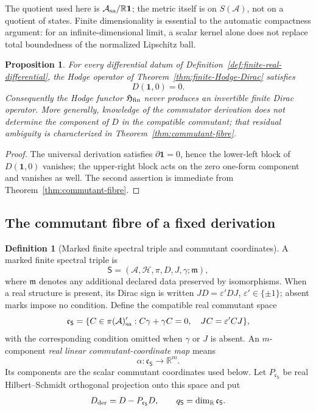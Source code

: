 \documentclass[11pt]{article}
\newtheorem{proposition}[proposition]{Proposition}
\theoremstyle{definition}
\newtheorem{definition}[definition]{Definition}
\theoremstyle{remark}
\theoremstyle{definition}
\theoremstyle{remark}
\newcommand{\R}{\mathbb R}
\newcommand{\one}{\mathbf 1}
\newcommand{\A}{\mathcal A}
\newcommand{\Hh}{\mathcal H}
\begin{document}
The quotient used here is $\A_{\rm sa}/\R\one$; the metric itself is on
$S(\A)$, not on a quotient of states.  Finite dimensionality is essential to
the automatic compactness argument: for an infinite-dimensional limit, a scalar
kernel alone does not replace total boundedness of the normalized Lipschitz ball.


\begin{proposition}
\label{prop:hodge-zero-mode}
For every differential datum of Definition~\ref{def:finite-real-differential}, the
Hodge operator of Theorem~\ref{thm:finite-Hodge-Dirac} satisfies
\begin{equation}
 D(\one,0)=0.
 \label{eq:hodge-zero-mode}
\end{equation}
Consequently the Hodge functor $\mathfrak H_{\rm fin}$ never produces an
invertible finite Dirac operator.  More generally, knowledge of the commutator
derivation does not determine the component of $D$ in the compatible commutant;
that residual ambiguity is characterized in Theorem~\ref{thm:commutant-fibre}.
\end{proposition}

\begin{proof}
The universal derivation satisfies $\partial\one=0$, hence the lower-left block of
$D(\one,0)$ vanishes; the upper-right block acts on the zero one-form component and
vanishes as well.  The second assertion is immediate from
Theorem~\ref{thm:commutant-fibre}.
\end{proof}

\subsection{The commutant fibre of a fixed derivation}

\begin{definition}[Marked finite spectral triple and commutant coordinates]
\label{def:marked-spectral-triple}
A marked finite spectral triple is
\[
 \mathsf S=(\A,\Hh,\pi,D,J,\gamma;\mathfrak m),
\]
where $\mathfrak m$ denotes any additional declared data preserved by
isomorphisms.  When a real structure is present, its Dirac sign is written
$JD=\varepsilon'DJ$, $\varepsilon'\in\{\pm1\}$; absent marks impose no
condition.  Define the compatible real commutant space
\begin{equation}
 \mathfrak c_{\mathsf S}
 =\{C\in\pi(\A)'_{\rm sa}:
 C\gamma+\gamma C=0,\quad JC=\varepsilon'CJ\},
 \label{eq:commutant-space}
\end{equation}
with the corresponding condition omitted when $\gamma$ or $J$ is absent.  An $m$-component \emph{real linear commutant-coordinate map} means
\[
 \alpha:\mathfrak c_{\mathsf S}\longrightarrow\R^m.
\]
Its components are the scalar commutant coordinates used below.
Let $P_{\mathfrak c_{\mathsf S}}$ be real Hilbert--Schmidt orthogonal projection
onto this space and put
\begin{equation}
 D_{\rm der}=D-P_{\mathfrak c_{\mathsf S}}D,
 \qquad
 q_{\mathsf S}=\dim_{\R}\mathfrak c_{\mathsf S}.
 \label{eq:centered-D}
\end{equation}
\end{definition}
\end{document}
